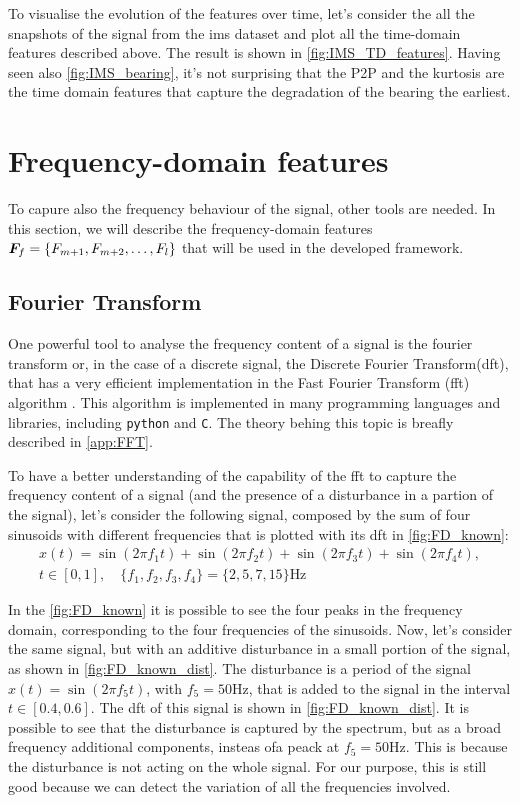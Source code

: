 To visualise the evolution of the features over time, let's consider the all the snapshots of the  signal from the \gls{ims} dataset and plot all the time-domain features described above. The result is shown in \autoref{fig:IMS_TD_features}. Having seen also \autoref{fig:IMS_bearing}, it's not surprising that the P2P and the kurtosis are the time domain features that capture the degradation of the bearing the earliest. 


\section{Frequency-domain features}

To capure also the frequency behaviour of the signal, other tools are needed. In this section, we will describe the frequency-domain features  $\bm{F}_f = \{F_{m+1}, F_{m+2}, \dots, F_l\}$ that will be used in the developed framework.

\subsection{Fourier Transform}
\label{sec:FFT}

One powerful tool to analyse the frequency content of a signal is the fourier transform or, in the case of a discrete signal, the Discrete Fourier Transform(\gls{dft}), that has a very efficient implementation in the Fast Fourier Transform (\gls{fft}) algorithm \cite{cooley1965algorithm}. This algorithm is implemented in many programming languages and libraries, including \texttt{python} and \texttt{C}. The theory behing this topic is breafly described in \autoref{app:FFT}. 

To have a better understanding of the capability of the \gls{fft} to capture the frequency content of a signal (and the presence of a disturbance in a partion of the signal), let's consider the following signal, composed by the sum of four sinusoids with different frequencies that is plotted with its \gls{dft} in \autoref{fig:FD_known}:
\begin{multline}
    x(t) = \sin(2\pi f_1 t) + \sin(2\pi f_2 t) + \sin(2\pi f_3 t) + \sin(2\pi f_4 t), \\
    t \in [0, 1], \quad \{f_1, f_2, f_3, f_4\} = \{2, 5, 7, 15\} \si{\Hz}
\end{multline}

In the \autoref{fig:FD_known} it is possible to see the four peaks in the frequency domain, corresponding to the four frequencies of the sinusoids. Now, let's consider the same signal, but with an additive disturbance in a small portion of the signal, as shown in \autoref{fig:FD_known_dist}. The disturbance is a period of the signal $x(t) = \sin(2\pi f_5 t)$, with $f_5=50\si{\Hz}$, that is added to the signal in the interval $t \in [0.4, 0.6]$. The \gls{dft} of this signal is shown in \autoref{fig:FD_known_dist}. It is possible to see that the disturbance is captured by the spectrum, but as a broad frequency additional components, insteas ofa peack at $f_5=50\si{\Hz}$. This is because the disturbance is not acting on the whole signal. For our purpose, this is still good because we can detect the variation of all the frequencies involved.

